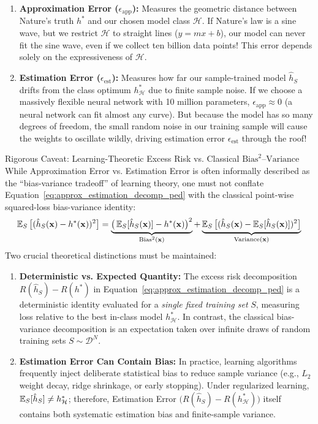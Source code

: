 \begin{enumerate}
    \item \textbf{Approximation Error ($\epsilon_{\text{app}}$):} Measures the geometric distance between Nature's truth $h^*$ and our chosen model class $\mathcal{H}$. If Nature's law is a sine wave, but we restrict $\mathcal{H}$ to straight lines ($y = mx + b$), our model can never fit the sine wave, even if we collect ten billion data points! This error depends solely on the expressiveness of $\mathcal{H}$.
    \item \textbf{Estimation Error ($\epsilon_{\text{est}}$):} Measures how far our sample-trained model $\hat{h}_S$ drifts from the class optimum $h^*_{\mathcal{H}}$ due to finite sample noise. If we choose a massively flexible neural network with 10 million parameters, $\epsilon_{\text{app}} \approx 0$ (a neural network can fit almost any curve). But because the model has so many degrees of freedom, the small random noise in our training sample will cause the weights to oscillate wildly, driving estimation error $\epsilon_{\text{est}}$ through the roof!
\end{enumerate}

\begin{warningbox}{Rigorous Caveat: Learning-Theoretic Excess Risk vs. Classical $\text{Bias}^2$--$\text{Variance}$}
While Approximation Error vs. Estimation Error is often informally described as the ``bias-variance tradeoff'' of learning theory, one must not conflate Equation~\eqref{eq:approx_estimation_decomp_ped} with the classical point-wise squared-loss bias-variance identity:
\begin{equation*}
\operatorname{\mathbb{E}}_S\big[(\hat{h}_S(\mathbf{x}) - h^*(\mathbf{x}))^2\big] = \underbrace{\big(\operatorname{\mathbb{E}}_S[\hat{h}_S(\mathbf{x})] - h^*(\mathbf{x})\big)^2}_{\text{Bias}^2(\mathbf{x})} + \underbrace{\operatorname{\mathbb{E}}_S\big[(\hat{h}_S(\mathbf{x}) - \operatorname{\mathbb{E}}_S[\hat{h}_S(\mathbf{x})])^2\big]}_{\text{Variance}(\mathbf{x})}
\end{equation*}
Two crucial theoretical distinctions must be maintained:
\begin{enumerate}[leftmargin=*, noitemsep]
    \item \textbf{Deterministic vs. Expected Quantity:} The excess risk decomposition $R(\hat{h}_S) - R(h^*)$ in Equation~\eqref{eq:approx_estimation_decomp_ped} is a deterministic identity evaluated for a \emph{single fixed training set} $S$, measuring loss relative to the best in-class model $h^*_{\mathcal{H}}$. In contrast, the classical bias-variance decomposition is an expectation taken over infinite draws of random training sets $S \sim \mathcal{D}^N$.
    \item \textbf{Estimation Error Can Contain Bias:} In practice, learning algorithms frequently inject deliberate statistical bias to reduce sample variance (e.g., $L_2$ weight decay, ridge shrinkage, or early stopping). Under regularized learning, $\operatorname{\mathbb{E}}_S[\hat{h}_S] \ne h^*_{\mathcal{H}}$; therefore, Estimation Error $\big(R(\hat{h}_S) - R(h^*_{\mathcal{H}})\big)$ itself contains both systematic estimation bias and finite-sample variance.
\end{enumerate}
\end{warningbox}


